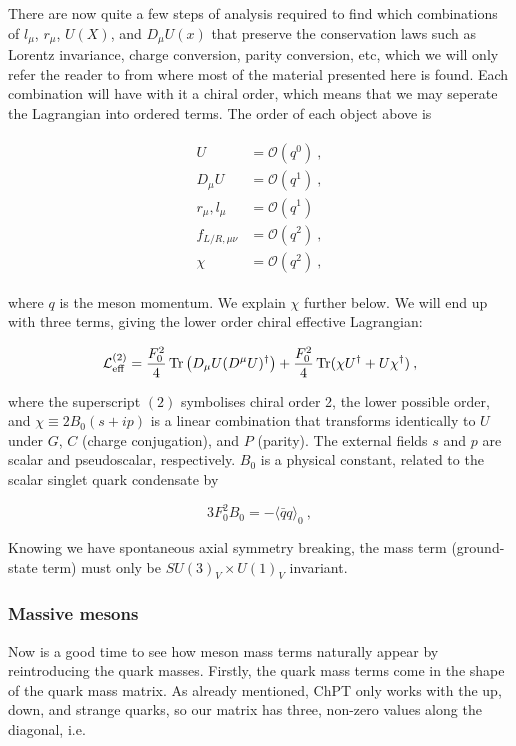 \documentclass[10pt,twoside]{report}
\begin{document}
	There are now quite a few steps of analysis required to find which combinations of $l_\mu$, $r_\mu$, $U(X)$, and $D_\mu U(x)$ that preserve the conservation laws such as Lorentz invariance, charge conversion, parity conversion, etc, which we will only refer the reader to \cite{SchererSchingler12} from where most of the material presented here is found. Each combination will have with it a chiral order, which means that we may seperate the Lagrangian into ordered terms. The order of each object above is
	
	\begin{align}
		\begin{split}
		U &= \mathcal{O}(q^0) \:,\\
		D_\mu U &= \mathcal{O}(q^1) \:,\\
		r_\mu,l_\mu &= \mathcal{O}(q^1) \\
		f_{L/R,\mu\nu} &= \mathcal{O}(q^2) \:,\\
		\chi &= \mathcal{O}(q^2)\:,
		\end{split}
	\end{align}
	
	\noindent where $q$ is the meson momentum. We explain $\chi$ further below. We will end up with three terms, giving the lower order chiral effective Lagrangian:
	
	\begin{equation}
	\mathcal{L}_{\text{eff}}^{(2)} = \frac{F_0^2}{4}\Tr \left(D_\mu U (D^\mu U)^\dagger\right) + \frac{F_0^2}{4}\Tr (\chi U^\dagger + U\chi^\dagger) \:,
	\label{ChPtTh | eq | "lowest order meson Lagrangian"}
	\end{equation}
	
	\noindent where the superscript $(2)$ symbolises chiral order 2, the lower possible order, and $\chi \equiv 2B_0(s+ip)$ is a linear combination that transforms identically to $U$ under $G$, $C$ (charge conjugation), and $P$ (parity). The external fields $s$ and $p$ are scalar and pseudoscalar, respectively. $B_0$ is a physical constant, related to the scalar singlet quark condensate by \cite{SchererSchingler12}
	
	\begin{equation}
		3F_0^2B_0 = -\langle\bar{q}q\rangle_0 \:,
	\end{equation}
	
	Knowing we have spontaneous axial symmetry breaking, the mass term (ground-state term) must only be $SU(3)_V\times U(1)_V$ invariant.
	
	\subsubsection{Massive mesons}
	Now is a good time to see how meson mass terms naturally appear by reintroducing the quark masses. Firstly, the quark mass terms come in the shape of the quark mass matrix. As already mentioned, ChPT only works with the up, down, and strange quarks, so our matrix has three, non-zero values along the diagonal, i.e.
	
\end{document}
